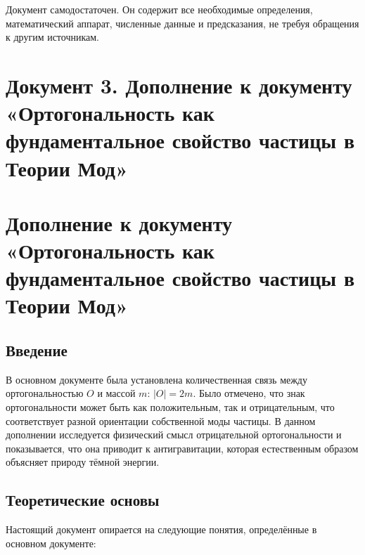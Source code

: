 \documentclass[12pt,a4paper]{article}
\begin{document}
Документ самодостаточен. Он содержит все необходимые определения, математический аппарат, численные данные и предсказания, не требуя обращения к другим источникам.


\newpage
\section*{Документ 3. Дополнение к документу «Ортогональность как фундаментальное свойство частицы в Теории Мод»}

\section{Дополнение к документу «Ортогональность как фундаментальное свойство частицы в Теории Мод»}

\subsection{Введение}
В основном документе была установлена количественная связь между ортогональностью $O$ и массой $m$: $|O| = 2m$. Было отмечено, что знак ортогональности может быть как положительным, так и отрицательным, что соответствует разной ориентации собственной моды частицы. В данном дополнении исследуется физический смысл отрицательной ортогональности и показывается, что она приводит к антигравитации, которая естественным образом объясняет природу тёмной энергии.

\subsection{Теоретические основы}
Настоящий документ опирается на следующие понятия, определённые в основном документе:
\end{document}
